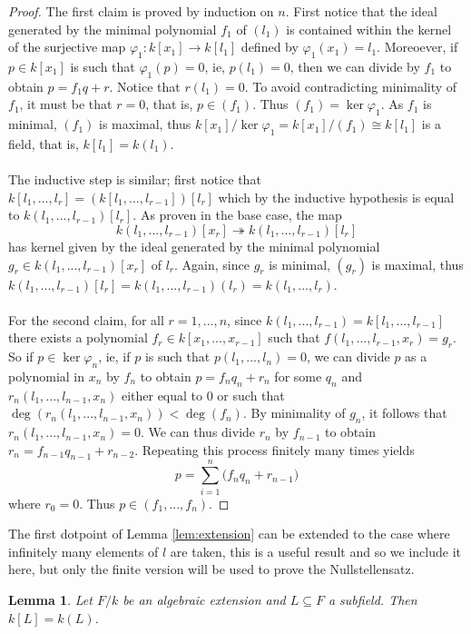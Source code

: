 \documentclass[12pt]{article}
\theoremstyle{plain}
\newtheorem{lemma}[thm]{Lemma}
\theoremstyle{definition}
\begin{document}
	\begin{proof}
		The first claim is proved by induction on $n$. First notice that the ideal generated by the minimal polynomial $f_1$ of $(l_1)$ is contained within the kernel of the surjective map $\varphi_1: k[x_1] \to k[l_1]$ defined by $\varphi_1(x_1) = l_1$. Moreoever, if $p \in k[x_1]$ is such that $\varphi_1(p) = 0$, ie, $p(l_1) = 0$, then we can divide by $f_1$ to obtain $p = f_1 q + r$. Notice that $r(l_1) = 0$. To avoid contradicting minimality of $f_1$, it must be that $r = 0$, that is, $p \in (f_1)$. Thus $(f_1) = \operatorname{ker}\varphi_1$. As $f_1$ is minimal, $(f_1)$ is maximal, thus $k[x_1]/\operatorname{ker}\varphi_1 = k[x_1]/(f_1) \cong k[l_1]$ is a field, that is, $k[l_1] = k(l_1)$.\\\\
		The inductive step is similar; first notice that $k[l_1,...,l_r] = (k[l_1,...,l_{r-1}])[l_r]$ which by the inductive hypothesis is equal to $k(l_1,...,l_{r-1})[l_r]$. As proven in the base case, the map
		\[k(l_1,...,l_{r-1})[x_r] \twoheadrightarrow k(l_1,...,l_{r-1})[l_r]\]
		has kernel given by the ideal generated by the minimal polynomial $g_r \in k(l_1,...,l_{r-1})[x_r]$ of $l_r$. Again, since $g_r$ is minimal, $(g_r)$ is maximal, thus $k(l_1,...,l_{r-1})[l_r] = k(l_1,...,l_{r-1})(l_r) = k(l_1,...,l_r)$.\\\\
		For the second claim, for all $r = 1,...,n$, since $k(l_1,...,l_{r-1}) = k[l_1,...,l_{r-1}]$ there exists a polynomial $f_r \in k[x_1,...,x_{r-1}]$ such that $f(l_1,...,l_{r-1},x_r) = g_r$. So if $p \in \operatorname{ker}\varphi_n$, ie, if $p$ is such that $p(l_1,...,l_n) = 0$, we can divide $p$ as a polynomial in $x_n$ by $f_n$ to obtain $p = f_n q_n + r_n$ for some $q_n$ and $r_n(l_1,...,l_{n-1},x_n)$ either equal to $0$ or such that $\operatorname{deg}(r_n(l_1,...,l_{n-1},x_n)) < \operatorname{deg}(f_n)$. By minimality of $g_n$, it follows that $r_n(l_1,...,l_{n-1},x_n) = 0$. We can thus divide $r_n$ by $f_{n-1}$ to obtain $r_n = f_{n-1}q_{n-1} + r_{n-2}$. Repeating this process finitely many times yields
		\[p = \sum_{i =1}^n \big(f_nq_n + r_{n-1}\big)\]
		where $r_0 = 0$. Thus $p \in (f_1,...,f_n)$.
	\end{proof}
	The first dotpoint of Lemma \ref{lem:extension} can be extended to the case where infinitely many elements of $l$ are taken, this is a useful result and so we include it here, but only the finite version will be used to prove the Nullstellensatz.
	\begin{lemma}
		\label{lem:ext_infinite}
		Let $F/k$ be an algebraic extension and $L \subseteq F$ a subfield. Then $k[L] = k(L)$.
	\end{lemma}
\end{document}
